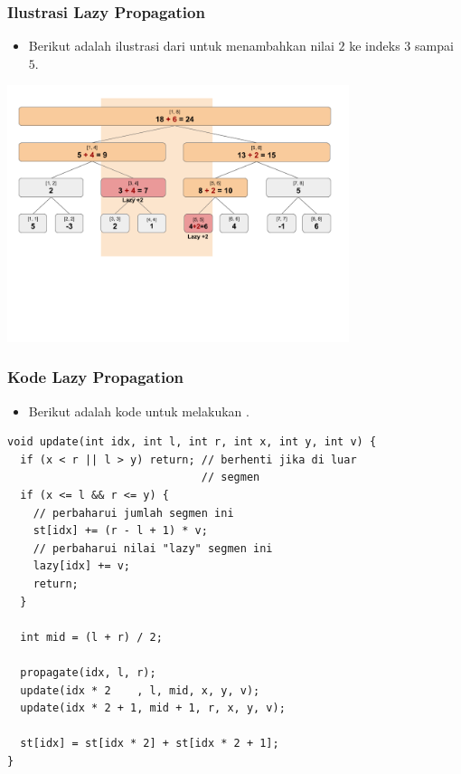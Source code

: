 \begin{frame}
\frametitle{Ilustrasi Lazy Propagation}
\begin{itemize}
  \item Berikut adalah ilustrasi dari \flazyPropagation untuk menambahkan nilai $2$ ke indeks $3$ sampai $5$.
\end{itemize}
\begin{center}
  \includegraphics[width=10cm]{asset/segtree-update-lazy.png}
\end{center}
\end{frame}

\begin{frame}[fragile]
\frametitle{Kode Lazy Propagation}
\begin{itemize}
  \item Berikut adalah kode untuk melakukan \flazyPropagation.
\end{itemize}
  \begin{lstlisting}
void update(int idx, int l, int r, int x, int y, int v) {
  if (x < r || l > y) return; // berhenti jika di luar
                              // segmen
  if (x <= l && r <= y) {
    // perbaharui jumlah segmen ini
    st[idx] += (r - l + 1) * v;     
    // perbaharui nilai "lazy" segmen ini
    lazy[idx] += v;                 
    return;
  }
  
  int mid = (l + r) / 2;

  propagate(idx, l, r);
  update(idx * 2    , l, mid, x, y, v);
  update(idx * 2 + 1, mid + 1, r, x, y, v);
  
  st[idx] = st[idx * 2] + st[idx * 2 + 1];
}
\end{lstlisting}
\end{frame}


